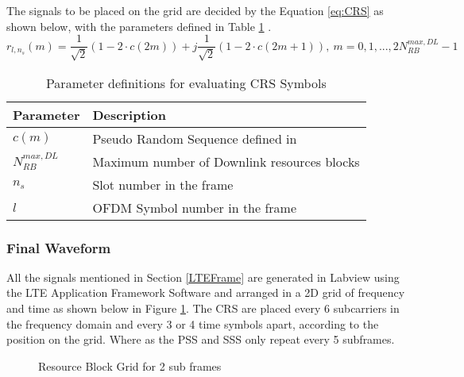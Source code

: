        The signals to be placed on the grid are decided by the Equation \ref{eq:CRS} as shown below, with the parameters defined in Table \ref{tab:CRSParam} \cite{3gpp36211}.
        \begin{equation} \label{eq:CRS}
            r_{l,n_s}(m) = \frac{1}{\sqrt{2}}(1-2{\cdot}c(2m)) + j\frac{1}{\sqrt{2}}(1-2{\cdot}c(2m+1)),\ m=0,1,...,2N_{RB}^{max,DL}-1
        \end{equation}

        \begin{table}[H]
            \begin{center}
                \begin{tabular}{|l|l|}
                    \hline
                    Parameter& Description\\ \hline
                    $c(m)$& Pseudo Random Sequence defined in \cite{3gpp36211}\\ \hline
                    $N_{RB}^{max,DL}$& Maximum number of Downlink resources blocks\\ \hline
                    $n_s$& Slot number in the frame\\ \hline
                    $l$& OFDM Symbol number in the frame\\
                    \hline
                \end{tabular}
                \caption{Parameter definitions for evaluating CRS Symbols}
                \label{tab:CRSParam}
            \end{center}
        \end{table}

\subsubsection{Final Waveform}
All the signals mentioned in Section \ref{LTEFrame} are generated in Labview using the LTE Application Framework Software and arranged in a 2D grid of frequency and time as shown below in Figure \ref{fig:RBSignals}. The CRS are placed every 6 subcarriers in the frequency domain and every 3 or 4 time symbols apart, according to the position on the grid. Where as the PSS and SSS only repeat every 5 subframes.

\begin{figure}[H]
    \begin{center}
        \caption{Resource Block Grid for 2 sub frames}
        \label{fig:RBSignals}
    \end{center}
\end{figure}

